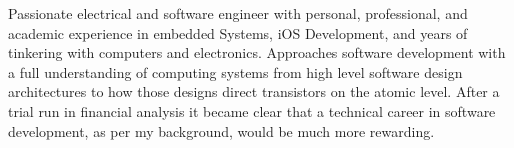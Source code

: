 

\begin{cvparagraph}

Passionate electrical and software engineer with personal, professional, and academic experience in embedded Systems, iOS Development, and years of tinkering with computers and electronics. Approaches software development with a full understanding of computing systems from high level software design architectures to how those designs direct transistors on the atomic level. After a trial run in financial analysis it became clear that a technical career in software development, as per my background, would be much more rewarding.

\end{cvparagraph}
